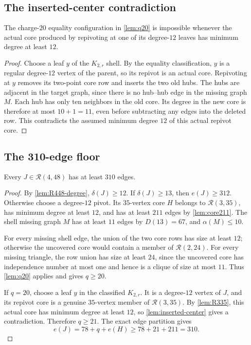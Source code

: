 \subsection{The inserted-center contradiction}

\begin{lemma}
\label{lem:inserted-center}
The charge-$20$ equality configuration in \cref{lem:q20} is impossible whenever the actual core produced by repivoting at one of its degree-$12$ leaves has minimum degree at least $12$.
\end{lemma}

\begin{proof}
Choose a leaf $y$ of the $K_{2,r}$ shell. By the equality classification, $y$ is a regular degree-$12$ vertex of the parent, so its repivot is an actual core. Repivoting at $y$ removes its two-point core row and inserts the two old hubs. The hubs are adjacent in the target graph, since there is no hub--hub edge in the missing graph $M$. Each hub has only ten neighbors in the old core. Its degree in the new core is therefore at most $10+1=11$, even before subtracting any edges into the deleted row. This contradicts the assumed minimum degree $12$ of this actual repivot core.
\end{proof}

\subsection{The 310-edge floor}

\begin{theorem}
\label{thm:floor48}
Every $J\in\mathcal R(4,48)$ has at least $310$ edges.
\end{theorem}

\begin{proof}
By \cref{lem:R448-degree}, $\delta(J)\geq12$. If $\delta(J)\geq13$, then $e(J)\geq312$. Otherwise choose a degree-$12$ pivot. Its $35$-vertex core $H$ belongs to $\mathcal R(3,35)$, has minimum degree at least $12$, and has at least $211$ edges by \cref{lem:core211}. The shell missing graph $M$ has at least $11$ edges by $D(13)=67$, and $\alpha(M)\leq10$.

For every missing shell edge, the union of the two core rows has size at least $12$; otherwise the uncovered core would contain a member of $\mathcal R(2,24)$. For every missing triangle, the row union has size at least $24$, since the uncovered core has independence number at most one and hence is a clique of size at most $11$. Thus \cref{lem:q20} applies and gives $q\geq20$.

If $q=20$, choose a leaf $y$ in the classified $K_{2,r}$. It is a degree-$12$ vertex of $J$, and its repivot core is a genuine $35$-vertex member of $\mathcal R(3,35)$. By \cref{lem:R335}, this actual core has minimum degree at least $12$, so \cref{lem:inserted-center} gives a contradiction. Therefore $q\geq21$. The exact edge partition gives
\[
e(J)=78+q+e(H)\geq78+21+211=310.
\]
\end{proof}

